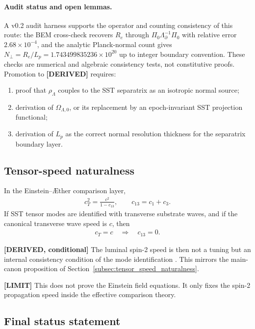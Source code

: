 \paragraph{Audit status and open lemmas.}
A v0.2 audit harness supports the operator and counting consistency of
this route: the BEM cross-check recovers \(R_e\) through
\(\Pi_0\Lambda_\partial^{-1}\Pi_0\) with relative error
\(2.68\times10^{-4}\), and the analytic Planck-normal count gives
\(N_\perp=R_e/L_p=1.743499835236\times10^{20}\) up to integer
boundary convention.  These checks are numerical and algebraic consistency
tests, not constitutive proofs.  Promotion to \textbf{[DERIVED]} requires:
\begin{enumerate}
    \item proof that \(\rho_\Lambda\) couples to the SST separatrix as an
    isotropic normal source;
    \item derivation of \(\Omega_{\Lambda,0}\), or its replacement by an
    epoch-invariant SST projection functional;
    \item derivation of \(L_p\) as the correct normal resolution thickness
    for the separatrix boundary layer.
\end{enumerate}

\subsection{Tensor-speed naturalness}

In the Einstein--\AE ther comparison layer,
\begin{align}
    c_T^2
    =
    \frac{c^2}{1-c_{13}},
    \qquad
    c_{13}=c_1+c_3 .
\end{align}
If SST tensor modes are identified with transverse substrate waves, and if the
canonical transverse wave speed is \(c\), then
\begin{align}
    c_T=c
    \quad\Rightarrow\quad
    c_{13}=0 .
\end{align}

\textbf{[DERIVED, conditional]} The luminal spin-2 speed is then not a tuning
but an internal consistency condition of the mode identification
\cite{FosterJacobson2006,Abbott2017GW170817}. This mirrors the main-canon
proposition of Section~\ref{subsec:tensor_speed_naturalness}.

\textbf{[LIMIT]} This does not prove the Einstein field equations. It only
fixes the spin-2 propagation speed inside the effective comparison theory.

\subsection{Final status statement}

